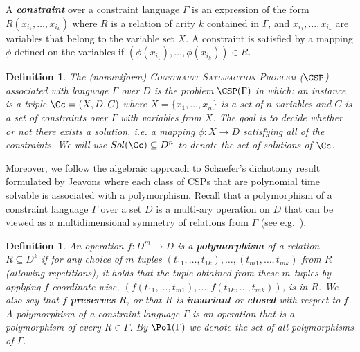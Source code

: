 \documentclass[11pt]{article}
\newtheorem{definition}[theorem]{Definition}
\begin{document}
A \emph{\textbf{constraint}} over a constraint language $\Gamma$ is an expression of the form $R(x_{i_1},\ldots, x_{i_k})$ where $R$ is a relation of arity $k$ contained in $\Gamma$, and $x_{i_1},\ldots, x_{i_k}$ are variables that belong to the variable set $X$. A constraint is satisfied by a mapping $\phi$ defined on the variables if $(\phi(x_{i_1}),\ldots, \phi(x_{i_k}))\in R$.

\begin{definition}\label{def:csp}
 The \emph{(nonuniform) \textsc{Constraint Satisfaction Problem} ($\CSP$)} associated with language $\Gamma$ over $D$ is the problem $\CSP(\Gamma)$ in which: an instance is a triple $\Cc=(X,D,C)$ where $X=\{x_1,\ldots,x_n\}$ is a set of $n$ variables and $C$  is a set of constraints over $\Gamma$ with variables from $X$. The goal is to decide whether or not there exists a solution, i.e. a mapping $\phi: X\rightarrow D$ satisfying all of the constraints. We will use $Sol(\Cc)\subseteq D^n$ to denote the set of solutions of $\Cc$.
\end{definition}
Moreover, we follow the algebraic approach to Schaefer's dichotomy result \cite{Schaefer78} formulated by Jeavons \cite{JEAVONS1998185} where each class of CSPs that are polynomial time solvable is associated with a polymorphism.
Recall that a polymorphism of a constraint language $\Gamma$ over a set $D$ is a multi-ary operation on $D$ that can be viewed as a multidimensional symmetry of relations from $\Gamma$ (see e.g.~\cite{barto_et_al:DFU:2017:6959}).
\begin{definition}\label{def:polymorph}
An operation $f:D^m \rightarrow D$ is a \textbf{polymorphism} of a relation $R\subseteq D^k$ if for any choice of $m$ tuples $(t_{11},\dots,t_{1k}),\dots,(t_{m1},\dots,t_{mk})$ from $R$ (allowing repetitions), it holds that the tuple obtained from these $m$ tuples by applying $f$ coordinate-wise, $(f(t_{11},\dots,t_{m1}),\dots,f(t_{1k},\dots,t_{mk}))$, is in $R$. We also say that $f$ \textbf{preserves} $R$, or that $R$ is \textbf{invariant} or \textbf{closed} with respect to $f$. A polymorphism of a constraint language $\Gamma$ is an operation that is a polymorphism of every $R\in \Gamma$. By $\Pol(\Gamma)$ we denote the set of all polymorphisms of $\Gamma$. 
\end{definition}




\end{document}
